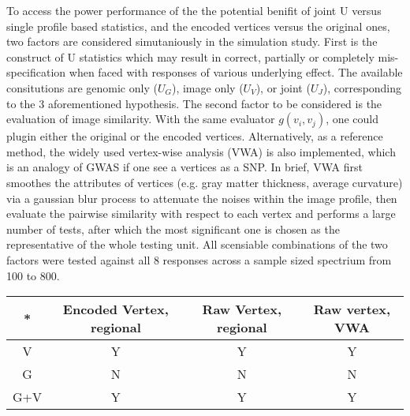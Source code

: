 \documentclass[twocolumn]{article}
\begin{document}
To access the power performance of the the potential benifit of joint U versus single profile based statistics, and the encoded vertices versus the original ones, two factors are considered simutaniously in the simulation study. First is the construct of U statistics which may result in correct, partially or completely mis-specification when faced with responses of various underlying effect. The available consitutions are genomic only ($U_G$), image only ($U_V$), or joint ($U_J$), corresponding to the 3 aforementioned hypothesis. The second factor to be considered is the evaluation of image similarity. With the same evaluator $g(v_i, v_j)$, one could plugin either the original or the encoded vertices. Alternatively, as a reference method, the widely used vertex-wise analysis (VWA) is also implemented, which is an analogy of GWAS if one see a vertices as a SNP. In brief, VWA first smoothes the attributes of vertices (e.g. gray matter thickness, average curvature) via a gaussian blur process to attenuate the noises within the image profile, then evaluate the pairwise similarity with respect to each vertex and performs a large number of tests, after which the most significant one is chosen as the representative of the whole testing unit. All scensiable combinations of the two factors were tested against all 8 responses across a sample sized spectrium from 100 to 800.

\begin{tabular}{|c|c|c|c|}
  \hline
  *   & Encoded Vertex, regional & Raw Vertex, regional & Raw vertex, VWA  \\ \hline
  V   & Y              & Y          & Y            \\ \hline
  G   & N              & N          & N            \\ \hline
  G+V & Y              & Y          & Y            \\ \hline
\end{tabular}
\end{document}
